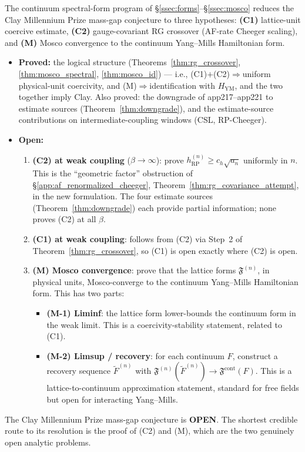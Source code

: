 \begin{theorem}
\label{thm:spf_status}
The continuum spectral-form program of
\S\ref{ssec:forms}--\S\ref{ssec:mosco} reduces the Clay Millennium
Prize mass-gap conjecture to three hypotheses:
\textbf{(C1)} lattice-unit coercive estimate,
\textbf{(C2)} gauge-covariant RG crossover (AF-rate Cheeger
scaling), and \textbf{(M)} Mosco convergence to the continuum
Yang--Mills Hamiltonian form.
\begin{itemize}
\item \textbf{Proved:} the logical structure
(Theorems~\ref{thm:rg_crossover}, \ref{thm:mosco_spectral},
\ref{thm:mosco_id}) --- i.e., (C1)$+$(C2)$\Rightarrow$uniform
physical-unit coercivity, and (M)$\Rightarrow$identification with
$H_{\mathrm{YM}}$, and the two together imply Clay. Also proved:
the downgrade of app217--app221 to estimate sources
(Theorem~\ref{thm:downgrade}), and the estimate-source
contributions on intermediate-coupling windows (CSL, RP-Cheeger).
\item \textbf{Open:}
\begin{enumerate}
\item \textbf{(C2) at weak coupling} ($\beta\to\infty$): prove
$h_{\mathrm{RP}}^{(n)}\ge c_{h}\sqrt{a_{n}}$ uniformly in $n$.
This is the ``geometric factor'' obstruction of
\S\ref{app:af_renormalized_cheeger},
Theorem~\ref{thm:rg_covariance_attempt}, in the new formulation.
The four estimate sources (Theorem~\ref{thm:downgrade}) each
provide partial information; none proves (C2) at all $\beta$.
\item \textbf{(C1) at weak coupling}: follows from (C2) via
Step~2 of Theorem~\ref{thm:rg_crossover}, so (C1) is open exactly
where (C2) is open.
\item \textbf{(M) Mosco convergence}: prove that the lattice
forms $\mathfrak{F}^{(n)}$, in physical units, Mosco-converge to
the continuum Yang--Mills Hamiltonian form. This has two parts:
\begin{itemize}
\item \textbf{(M-1) Liminf}: the lattice form lower-bounds the
continuum form in the weak limit. This is a coercivity-stability
statement, related to (C1).
\item \textbf{(M-2) Limsup / recovery}: for each continuum
$F$, construct a recovery sequence $\tilde{F}^{(n)}$ with
$\mathfrak{F}^{(n)}(\tilde{F}^{(n)})\to
\mathfrak{F}^{\mathrm{cont}}(F)$. This is a lattice-to-continuum
approximation statement, standard for free fields but open for
interacting Yang--Mills.
\end{itemize}
\end{enumerate}
\end{itemize}
The Clay Millennium Prize mass-gap conjecture is \textbf{OPEN}.
The shortest credible route to its resolution is the proof of
(C2) and (M), which are the two genuinely open analytic problems.
\end{theorem}

